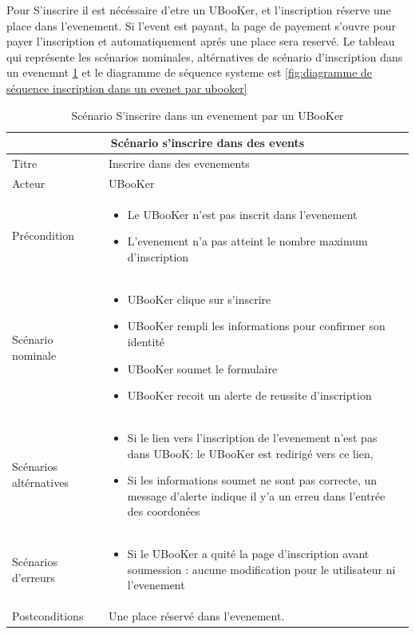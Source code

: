 \documentclass[12pt]{report}
\begin{document}
Pour S'inscrire il est nécéssaire d'etre un UBooKer, et l'inscription réserve une place dans l'evenement.
Si l'event est payant, la page de payement s'ouvre pour payer l'inscription et automatiquement aprés une place sera reservé.
Le tableau qui représente les scénarios nominales, altérnatives de scénario d'inscription dans un evenemnt \ref{table:scénarios'inscrire dans un evenemnet par un ubooker} et le diagramme de séquence systeme est \ref{fig:diagramme de séquence inscription dans un evenet par ubooker}
\begin{table}[h!]
\begin{center}
\begin{tabular}{ |p{4cm}|p{11cm}|  }
 \hline
 \multicolumn{2}{|c|}{Scénario s'inscrire dans des events} \\
 \hline
 Titre & Inscrire dans des evenements\\
 \hline
 Acteur& UBooKer \\
 \hline
 Précondition   & \begin{itemize} 
 \item Le UBooKer n'est pas inscrit dans l'evenement
 \item L'evenement n'a pas atteint le nombre maximum d'inscription 
 \end{itemize}   \\
 \hline 
 Scénario nominale &   \begin{itemize}
 \item UBooKer clique sur s'inscrire
 \item UBooKer rempli les informations pour confirmer son identité
 \item UBooKer soumet le formulaire
 \item UBooKer recoit un alerte de reussite d'inscription
\end{itemize}   \\
 \hline
 Scénarios altérnatives & \begin{itemize}
 \item Si le lien vers l'inscription de l'evenement n'est pas dans UBooK: le UBooKer est redirigé vers ce lien,
 \item Si les informations soumet ne sont pas correcte, un message d'alerte indique il y'a un erreu dans l'entrée des coordonées
\end{itemize}   \\
 \hline
 Scénarios d'erreurs &  \begin{itemize}
 \item Si le UBooKer a quité la page d'inscription avant soumession : 
 aucune modification pour le utilisateur ni l'evenement
\end{itemize}   \\
 \hline
 Postconditions & Une place réservé dans l'evenement. \\
 \hline
\end{tabular}
\caption{Scénario S'inscrire dans un evenement par un UBooKer}
\label{table:scénarios'inscrire dans un evenemnet par un ubooker}
\end{center}
\end{table}
\end{document}
